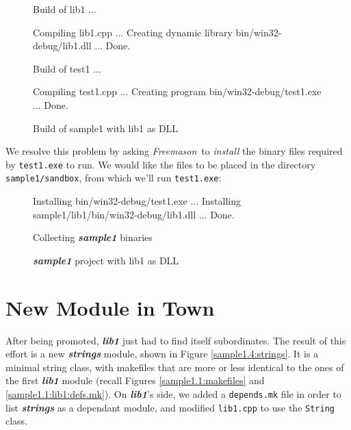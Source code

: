 \documentclass[a4paper]{article}
\newcommand{\freemason}{\textit{Freemason}}
\newcommand{\name}[1]{\emph{#1}}
\newcommand{\nameb}[1]{\textbf{\emph{#1}}}
\begin{document}
\begin{figure}[h]
\caption{\label{sample1.3:output}Build of sample1 with lib1 as DLL}
\begin{Code}
Build of lib1 ...

Compiling lib1.cpp ...
Creating dynamic library bin/win32-debug/lib1.dll ...
Done.

Build of test1 ...

Compiling test1.cpp ...
Creating program bin/win32-debug/test1.exe ...
Done.
\end{Code}
\end{figure}

We resolve this problem by asking \freemason\ to \name{install} the binary files required by \verb"test1.exe" to run. We would like
 the files to be placed in the directory \verb"sample1/sandbox", from which we'll run \verb"test1.exe":
\begin{center}
\end{center}

\begin{figure}[h]
\caption{\label{sample1.3:install}Collecting \nameb{sample1} binaries}
\begin{Code}
Installing bin/win32-debug/test1.exe ...
Installing sample1/lib1/bin/win32-debug/lib1.dll ...
Done.
\end{Code}
\end{figure}

\begin{figure}[h]
\caption{\label{sample1.3:project}\nameb{sample1} project with lib1 as DLL}
\begin{center}\end{center}
\end{figure}

\clearpage
\section{New Module in Town}

After being promoted, \nameb{lib1} just had to find itself subordinates. The result of this effort is a new \nameb{strings}
module, shown in Figure \ref{sample1.4:strings}. It is a minimal string class, with makefiles that are more or less identical to
the ones of the first \nameb{lib1} module (recall Figures \ref{sample1.1:makefiles} and \ref{sample1.1:lib1:defs.mk}).
On \nameb{lib1}'s side, we added a \verb"depends.mk" file in order to list
\nameb{strings} as a dependant module, and modified \verb"lib1.cpp" to use the \verb"String" class.
\end{document}
